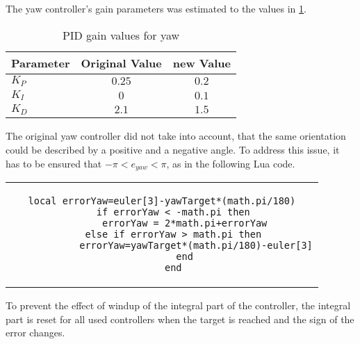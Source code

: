 The yaw controller's gain parameters was estimated to the values in \ref{tab:PIDyaw}.
\begin{table}[h]
	\centering
	\begin{tabular}{|l|c|c|}
    		\hline
		Parameter & Original Value & new Value \\
		\hline
    		$K_P$ & $0.25$ &  $0.2$\\
    		\hline
		$K_I$ & $0$ & $0.1$   \\
    		\hline
		$K_D$  & $2.1$ & $1.5$  \\
    		\hline
	\end{tabular}
    	\caption{PID gain values for yaw}
      	\label{tab:PIDyaw}
\end{table}
The original yaw controller did not take into account, that the same orientation could be described by a positive and a negative angle.
To address this issue, it has to be ensured that $-\pi<e_{yaw}<\pi$, as in the following Lua code.
\begin{center}
\begin{tabular}{c}
\begin{lstlisting}[basicstyle=\small, language={[5.2]Lua}]
	local errorYaw=euler[3]-yawTarget*(math.pi/180)
	if errorYaw < -math.pi then
		errorYaw = 2*math.pi+errorYaw
	else if errorYaw > math.pi then
			errorYaw=yawTarget*(math.pi/180)-euler[3]
		end
	end
\end{lstlisting}

\end{tabular}
\end{center}


To prevent the effect of windup of the integral part of the controller, the integral part is reset for all used controllers when the target is reached and the sign of the error changes.





